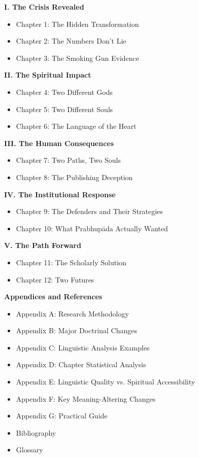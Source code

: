 \documentclass[11pt,twoside]{book}
\begin{document}
\setlength{\parskip}{1pt}
\textbf{I.  The Crisis Revealed}
\begin{itemize}
\item Chapter 1: The Hidden Transformation
\item Chapter 2: The Numbers Don't Lie
\item Chapter 3: The Smoking Gun Evidence
\end{itemize}
\vspace{0.4cm}
\textbf{II.  The Spiritual Impact}
\begin{itemize}
\item Chapter 4: Two Different Gods
\item Chapter 5: Two Different Souls
\item Chapter 6: The Language of the Heart
\end{itemize}
\vspace{0.4cm}
\textbf{III.  The Human Consequences}
\begin{itemize}
\item Chapter 7: Two Paths, Two Souls
\item Chapter 8: The Publishing Deception
\end{itemize}
\vspace{0.4cm}
\textbf{IV.  The Institutional Response}
\begin{itemize}
\item Chapter 9: The Defenders and Their Strategies
\item Chapter 10: What Prabhupāda Actually Wanted
\end{itemize}
\vspace{0.4cm}
\textbf{V.  The Path Forward}
\begin{itemize}
\item Chapter 11: The Scholarly Solution
\item Chapter 12: Two Futures
\end{itemize}
\setlength{\parskip}{4pt plus 1pt minus 1pt}

\newpage
\thispagestyle{fancy}

\textbf{Appendices and References}
\begin{itemize}
\item Appendix A: Research Methodology
\item Appendix B: Major Doctrinal Changes
\item Appendix C: Linguistic Analysis Examples
\item Appendix D: Chapter Statistical Analysis
\item Appendix E: Linguistic Quality vs. Spiritual Accessibility
\item Appendix F: Key Meaning-Altering Changes
\item Appendix G: Practical Guide
\item Bibliography
\item Glossary
\end{itemize}
\end{document}
